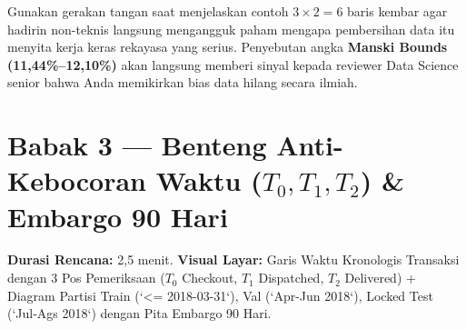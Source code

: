 \documentclass[11pt,a4paper,oneside]{book}
\begin{document}
\begin{tipbox}
Gunakan gerakan tangan saat menjelaskan contoh $3 \times 2 = 6$ baris kembar agar hadirin non-teknis langsung mengangguk paham mengapa pembersihan data itu menyita kerja keras rekayasa yang serius. Penyebutan angka \textbf{Manski Bounds (11,44\%--12,10\%)} akan langsung memberi sinyal kepada reviewer Data Science senior bahwa Anda memikirkan bias data hilang secara ilmiah.
\end{tipbox}

\section{Babak 3 --- Benteng Anti-Kebocoran Waktu ($T_0, T_1, T_2$) \& Embargo 90 Hari}

\begin{stagebox}
\textbf{Durasi Rencana:} 2,5 menit. \quad \textbf{Visual Layar:} Garis Waktu Kronologis Transaksi dengan 3 Pos Pemeriksaan ($T_0$ Checkout, $T_1$ Dispatched, $T_2$ Delivered) + Diagram Partisi Train (`<= 2018-03-31`), Val (`Apr-Jun 2018`), Locked Test (`Jul-Ags 2018`) dengan Pita Embargo 90 Hari.
\end{stagebox}
\end{document}
